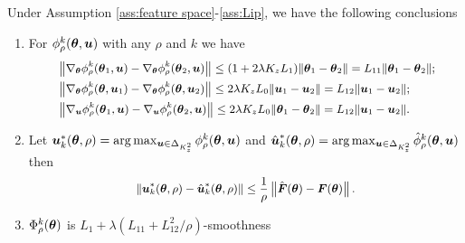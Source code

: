 \begin{lemma}\label{lem:continuty}
	Under Assumption \ref{ass:feature space}-\ref{ass:Lip}, we have the following conclusions
	\begin{enumerate}
		\item For $\phi_{\rho}^{k}(\text{\boldmath{$\theta$}}, \boldsymbol{u})$ with any $\rho$ and $k$ we have 
		\begin{equation}
			\small
			\begin{aligned}
				& \left\|\nabla_{\btheta}\phi_{\rho}^{k}(\btheta_{1}, \bu) - \nabla_{\btheta}\phi_{\rho}^{k}(\btheta_{2}, \bu)\right\| \leq (1 + 2\lambda K_{z}L_{1})\|\btheta_{1} - \btheta_{2}\| = L_{11}\|\btheta_{1} - \btheta_{2}\|; \\
				& \left\|\nabla_{\btheta}\phi_{\rho}^{k}(\btheta, \bu_{1}) - \nabla_{\btheta}\phi_{\rho}^{k}(\btheta, \bu_{2})\right\| \leq 2\lambda K_{z}L_{0}\|\bu_{1} - \bu_{2}\| = L_{12}\|\bu_{1} - \bu_{2}\|; \\
				& \left\|\nabla_{\bu}\phi_{\rho}^{k}(\btheta_{1}, \bu) - \nabla_{\bu}\phi_{\rho}^{k}(\btheta_{2}, \bu)\right\| \leq 2\lambda K_{z}L_{0}\|\btheta_{1} - \btheta_{2}\| = L_{12}\|\bu_{1} - \bu_{2}\|.
			\end{aligned}
		\end{equation}
		\item Let $\boldsymbol{u}^{*}_{k}(\text{\boldmath{$\theta$}}, \rho) = \arg\max_{\boldsymbol{u}\in\Delta_{K_{z}^{2}}}\phi^{k}_{\rho}(\text{\boldmath{$\theta$}}, \boldsymbol{u})$ and $\hat{\boldsymbol{u}}^{*}_{k}(\text{\boldmath{$\theta$}}, \rho) = \arg\max_{\boldsymbol{u}\in\Delta_{K_{z}^{2}}}\hat{\phi}^{k}_{\rho}(\text{\boldmath{$\theta$}}, \boldsymbol{u})$ then 
		\begin{equation}
			\small
			\left\|\bu^{*}_{k}(\btheta, \rho) - \hat{\bu}^{*}_{k}(\btheta, \rho)\right\| \leq \frac{1}{\rho}\left\|\hat{\bF}(\btheta) - \bF(\btheta)\right\|.
		\end{equation}
		\item $\Phi_{\rho}^{k}(\text{\boldmath{$\theta$}})$ is $L_{1} + \lambda\left(L_{11} + L_{12}^{2}/\rho\right)$-smoothness
	\end{enumerate}
\end{lemma}  	
